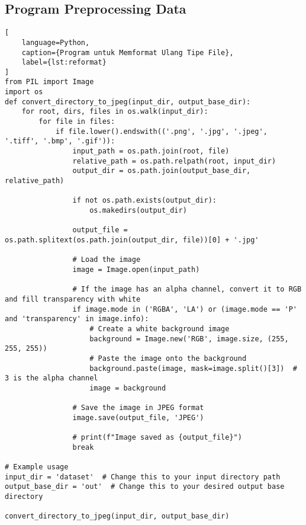 \subsection*{Program Preprocessing Data}
\begin{lstlisting}[
    language=Python,
    caption={Program untuk Memformat Ulang Tipe File},
    label={lst:reformat}
]
from PIL import Image
import os
def convert_directory_to_jpeg(input_dir, output_base_dir):
    for root, dirs, files in os.walk(input_dir):
        for file in files:
            if file.lower().endswith(('.png', '.jpg', '.jpeg', '.tiff', '.bmp', '.gif')):
                input_path = os.path.join(root, file)
                relative_path = os.path.relpath(root, input_dir)
                output_dir = os.path.join(output_base_dir, relative_path)

                if not os.path.exists(output_dir):
                    os.makedirs(output_dir)

                output_file = os.path.splitext(os.path.join(output_dir, file))[0] + '.jpg'

                # Load the image
                image = Image.open(input_path)

                # If the image has an alpha channel, convert it to RGB and fill transparency with white
                if image.mode in ('RGBA', 'LA') or (image.mode == 'P' and 'transparency' in image.info):
                    # Create a white background image
                    background = Image.new('RGB', image.size, (255, 255, 255))
                    # Paste the image onto the background
                    background.paste(image, mask=image.split()[3])  # 3 is the alpha channel
                    image = background

                # Save the image in JPEG format
                image.save(output_file, 'JPEG')

                # print(f"Image saved as {output_file}")
                break

# Example usage
input_dir = 'dataset'  # Change this to your input directory path
output_base_dir = 'out'  # Change this to your desired output base directory

convert_directory_to_jpeg(input_dir, output_base_dir)
\end{lstlisting}

